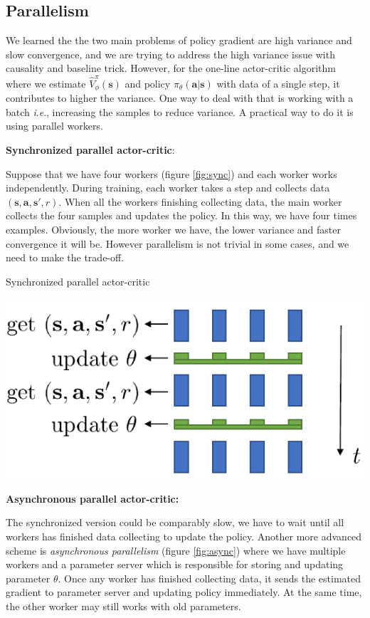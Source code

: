 \documentclass{tufte-handout}
\newcommand{\ie}{\textit{i}.\textit{e}., }
\newcommand{\s}{\mathbf{s}}
\newcommand{\act}{\mathbf{a}}
\begin{document}
\subsection{Parallelism}

We learned the the two main problems of policy gradient are high variance and slow convergence, and we are trying to address the high variance issue
with causality and baseline trick. However, for the one-line actor-critic algorithm where we estimate $\hat{V}_\phi ^ \pi (\s)$ and policy
$\pi_\theta(\act | \s)$ with data of a single step, it contributes to higher the variance. One way to deal with that is working with a batch \ie increasing the samples to reduce variance. A practical way to do it is using parallel workers.

\textbf{Synchronized parallel actor-critic}:

Suppose that we have four workers (figure \ref{fig:sync}) and each worker works independently. During training, each worker takes a step and collects data
$(\s, \act, \s', r)$. When all the workers finishing collecting data, the main worker collects the four samples and updates the policy. In this way, we have
four times examples. Obviously, the more worker we have, the lower variance and faster convergence it will be. However parallelism is not trivial in some
cases, and we need to make the trade-off.

\begin{marginfigure}
\caption{Synchronized parallel actor-critic}
\includegraphics[width=\linewidth]{sync}
\label{fig:sync}
\end{marginfigure}

\textbf{Asynchronous parallel actor-critic:}

The synchronized version could be comparably slow, we have to wait until all workers has finished data collecting to update the policy. Another more
advanced scheme is \emph{asynchronous parallelism} (figure \ref{fig:async}) where we have multiple workers and a parameter server which is responsible for
storing and updating parameter $\theta$. Once any worker has finished collecting data, it sends the estimated gradient to parameter server and updating policy immediately. At the same time, the other worker may still works with old parameters.
\end{document}
